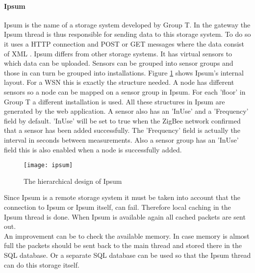 \paragraph{Ipsum}
Ipsum is the name of a storage system developed by Group T. In the gateway the Ipsum thread is thus responsible for sending data to this storage system. To do so it uses a HTTP connection and POST or GET messages where the data consist of XML . Ipsum differs from other storage systems. It has virtual sensors to which data can be uploaded. Sensors can be grouped into sensor groups and those in can turn be grouped into installations. Figure \ref{fig:ips} shows Ipsum's internal layout. For a WSN this is exactly the structure needed. A node has different sensors so a node can be mapped on a sensor group in Ipsum. For each 'floor' in Group T a different installation is used. All these structures in Ipsum are generated by the web application. A sensor also has an 'InUse' and a 'Frequency' field by default. 'InUse' will be set to true when the ZigBee network confirmed that a sensor has been added successfully. The 'Frequency' field is actually the interval in seconds between measurements. Also a sensor group has an 'InUse' field this is also enabled when a node is successfully added.\\
\begin{figure}[t]
\centering
\texttt{[image: ipsum]}
\caption{The hierarchical design of Ipsum}
\label{fig:ips}
\end{figure} 
\noindent
Since Ipsum is a remote storage system it must be taken into account that the connection to Ipsum or Ipsum itself, can fail. Therefore local caching in the Ipsum thread is done. When Ipsum is available again all cached packets are sent out.\\
An improvement can be to check the available memory. In case memory is almost full the packets should be sent back to the main thread and stored there in the SQL database. Or a separate SQL database can be used so that the Ipsum thread can do this storage itself.


